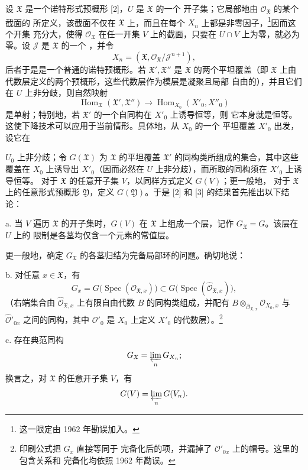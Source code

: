 设 $\mathfrak X$ 是一个诺特形式预概形 [2]，$U$ 是 $\mathfrak X$ 的一个
开子集；它局部地由 $\mathcal O_{\mathfrak X}$ 的某个截面的
所定义，该截面不仅在 $\mathfrak X$ 上，而且在每个
$X_n$ 上都是非零因子，\footnote{这一限定由 1962 年勘误加入。}因而这个开集
充分大，使得 $\mathcal O_{\mathfrak X}$ 在任一开集 $V$ 上的截面，只要在
$U\cap V$ 上为零，就必为零。设 $\mathcal J$ 是 $\mathfrak X$ 的一个
，并令
\[
  X_n=(\mathfrak X,\mathcal O_{\mathfrak X}/\mathcal J^{n+1}),
\]
后者于是是一个普通的诺特预概形。若
$\mathfrak X',\mathfrak X''$ 是 $\mathfrak X$ 的两个平坦覆盖（即
$\mathfrak X$ 上由代数层定义的两个预概形，这些代数层作为模层是凝聚且局部
自由的），并且它们在 $U$ 上非分歧，则自然映射
\[
  \operatorname{Hom}_{\mathfrak X}(\mathfrak X',\mathfrak X'')
  \longrightarrow
  \operatorname{Hom}_{X_0}(X'_0,X''_0)
\]
是单射；特别地，若 $\mathfrak X'$ 的一个自同构在 $X'_0$ 上诱导恒等，则
它本身就是恒等。这使下降技术可以应用于当前情形。具体地，从 $X_0$ 的一个
平坦覆盖 $X'_0$ 出发，设它在

$U_0$ 上非分歧；令 $G(\mathfrak X)$ 为 $\mathfrak X$ 的平坦覆盖
$\mathfrak X'$ 的同构类所组成的集合，其中这些覆盖在 $X_0$ 上诱导出
$X'_0$（因而必然在 $U$ 上非分歧），而所取的同构须在 $X'_0$ 上诱导恒等。
对于 $\mathfrak X$ 的任意开子集 $V$，以同样方式定义 $G(V)$；更一般地，
对于 $\mathfrak X$ 上的任意形式预概形 $\mathfrak Y$，定义
$G(\mathfrak Y)$。于是 [2] 和 [3] 的结果首先推出以下结论：

\noindent a. 当 $V$ 遍历 $\mathfrak X$ 的开子集时，$G(V)$ 在
$\mathfrak X$ 上组成一个层，记作 $G_{\mathfrak X}=G$。该层在 $U$ 上的
限制是各茎均仅含一个元素的常值层。

更一般地，确定 $G_{\mathfrak X}$ 的各茎归结为完备局部环的问题。确切地说：

\noindent b. 对任意 $x\in\mathfrak X$，有
\[
  G_x=G\bigl(\operatorname{Spec}(\mathcal O_{\mathfrak X,x})\bigr)
  \subset
  G\bigl(\operatorname{Spec}(\widehat{\mathcal O}_{\mathfrak X,x})\bigr),
\]
（右端集合由 $\widehat{\mathcal O}_{\mathfrak X,x}$ 上有限自由代数 $B$
的同构类组成，并配有
$B\otimes_{\widehat{\mathcal O}_{\mathfrak X,x}}\mathcal O_{X_0,x}$
与 $\widehat{\mathcal O}'_{0x}$ 之间的同构，其中 $\mathcal O'_0$ 是
$X_0$ 上定义 $X'_0$ 的代数层）。\footnote{印刷公式把 $G_x$ 直接等同于
完备化后的项，并漏掉了 $\mathcal O'_{0x}$ 上的帽号。这里的包含关系和
完备化均依照 1962 年勘误。}

\noindent c. 存在典范同构
\[
  G_{\mathfrak X}=\varprojlim_nG_{X_n} ;
\]
换言之，对 $\mathfrak X$ 的任意开子集 $V$，有
\[
  G(V)=\varprojlim_nG(V_n).
\]


